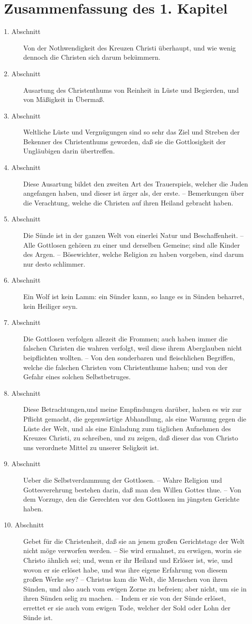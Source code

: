 \section{Zusammenfassung des 1. Kapitel}
\small
\begin{description}
\item[1. Abschnitt] Von der Nothwendigkeit des Kreuzen Christi überhaupt, und wie wenig dennoch die Christen sich darum bekümmern. 
\item[2. Abschnitt] Ausartung des Christenthums von Reinheit in Lüste und Begierden, und von Mäßigkeit in Übermaß. 
\item[3. Abschnitt] Weltliche Lüste und Vergnügungen sind so sehr das Ziel und Streben der Bekenner des Christenthums geworden, daß sie die Gottlosigkeit der Ungläubigen darin übertreffen.
\item[4. Abschnitt]  Diese Ausartung bildet den zweiten Art des Trauerspiels, welcher die Juden angefangen haben, und dieser ist ärger als, der erste. – Bemerkungen über die Verachtung, welche die Christen auf ihren Heiland gebracht haben.
\item[5. Abschnitt] Die Sünde ist in der ganzen Welt von einerlei Natur und Beschaffenheit. – Alle Gottlosen gehören zu einer und derselben Gemeine; sind alle Kinder des Argen. – Bösewichter, welche Religion zu haben vorgeben, sind darum nur desto schlimmer.
\item[6. Abschnitt] Ein Wolf ist kein Lamm: ein Sünder kann, so lange es in Sünden beharret, kein Heiliger seyn.
\item[7. Abschnitt] Die Gottlosen verfolgen allezeit die Frommen; auch haben immer die falschen Christen die wahren verfolgt, weil diese ihrem Aberglauben nicht beipflichten wollten. – Von den sonderbaren und fleischlichen Begriffen, welche die falschen Christen vom Christenthume haben; und von der Gefahr eines solchen Selbstbetruges.
\item[8. Abschnitt] Diese Betrachtungen,und meine Empfindungen darüber, haben es wir zur Pflicht gemacht, die gegenwärtige Abhandlung, als eine Warnung gegen die Lüste der Welt, und als eine Einladung zum täglichen Aufnehmen des Kreuzes Christi, zu schreiben, und zu zeigen, daß dieser das von Christo uns verordnete Mittel zu unserer Seligkeit ist.
\item[9. Abschnitt] Ueber die Selbstverdammung der Gottlosen. – Wahre Religion und Gottesverehrung bestehen darin, daß man den Willen Gottes thue. – Von dem Vorzuge, den die Gerechten vor den Gottlosen im jüngsten Gerichte haben.
\item[10. Abschnitt] Gebet für die Christenheit, daß sie an jenem großen Gerichtstage der Welt nicht möge verworfen werden. – Sie wird ermahnet, zu erwägen, worin sie Christo ähnlich sei; und, wenn er ihr Heiland und Erlöser ist, wie, und wovon er sie erlöset habe, und was ihre eigene Erfahrung von diesem großen Werke sey? – Christus kam die Welt, die Menschen von ihren Sünden, und also auch vom ewigen Zorne zu befreien; aber nicht, um sie in ihren Sünden selig zu machen. – Indem er sie von der Sünde erlöset, errettet er sie auch vom ewigen Tode, welcher der Sold oder Lohn der Sünde ist.
\end{description}
\normalsize


